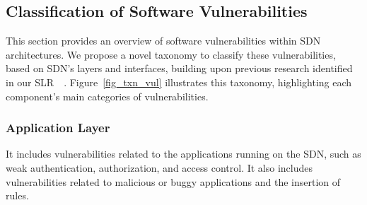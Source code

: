 \begin{adjustbox}{width=\linewidth}
\end{adjustbox}

\subsection{Classification of Software Vulnerabilities}
This section provides an overview of software vulnerabilities within SDN architectures. We propose a novel taxonomy to classify these vulnerabilities, based on SDN's layers and interfaces, building upon previous research identified in our SLR~\citep{AKHUNZADA2016199}\citep{CORREACHICA2020102595}~\citep{10.1145/3454127.3456612}. Figure~\ref{fig_txn_vul} illustrates this taxonomy, highlighting each component's main categories of vulnerabilities.
\subsubsection*{Application Layer}
It includes vulnerabilities related to the applications running on the SDN, such as weak authentication, authorization, and access control. It also includes vulnerabilities related to malicious or buggy applications and the insertion of rules.
